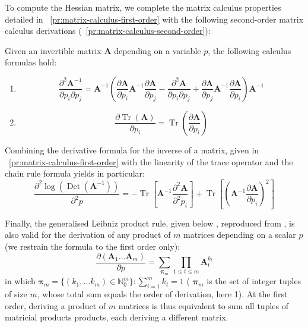 \documentclass[long, final]{jobim}
\DeclareMathOperator*{\Tr}{Tr}
\DeclareMathOperator*{\DET}{Det}
\begin{document}
To compute the Hessian matrix, we complete the matrix calculus properties detailed in \propertyname~\ref{pr:matrix-calculus-first-order} with the following second-order matrix calculus derivations (\propertyname~\ref{pr:matrix-calculus-second-order}):

\begin{property}
\label{pr:matrix-calculus-second-order}
Given an invertible matrix $\boldsymbol{A}$ depending on a variable $p$, the following calculus formulas hold:
\begin{multicols}{2}
\begin{enumerate}[label=(\alph*)]
\item 
$$ \frac{\partial^2 \boldsymbol{A}^{-1}}{\partial p_i \partial p_j} =  \boldsymbol{A}^{-1} \left( \frac{\partial \boldsymbol{A}}{\partial p_i } \boldsymbol{A}^{-1} \frac{\partial \boldsymbol{A}}{\partial p_j} - \frac{\partial^2 \boldsymbol{A}}{\partial p_i \partial p_j}  + \frac{\partial \boldsymbol{A}}{\partial p_j } \boldsymbol{A}^{-1} \frac{\partial \boldsymbol{A}}{\partial p_i}\right) \boldsymbol{A}^{-1}
$$
\item 
$$
\frac{\partial \Tr \left(\boldsymbol{A}\right)}{\partial p_i} = \Tr  \left(\frac{\partial \boldsymbol{A}}{\partial p_i}\right)
$$


\end{enumerate}
\end{multicols}

Combining the derivative formula for the inverse of a matrix, given in \propertyname~\ref{pr:matrix-calculus-first-order} with the linearity of the trace operator and the chain rule formula yields in particular:
\begin{equation*}
    \frac{\partial^2 \log \left(\DET (\boldsymbol{A}^{-1})\right)}{\partial^2 p} = - \Tr  \left[\boldsymbol{A}^{-1}\frac{\partial^2 \boldsymbol{A}}{\partial^2 p_i}\right] +
\Tr  \left[\left(\boldsymbol{A}^{-1}\frac{\partial \boldsymbol{A}}{\partial p_i}\right)^2\right]
\end{equation*}


Finally, the generalised Leibniz product rule, given below , reproduced from \cite{mulla20}, is also valid for the derivation of any product of $m$ matrices depending on a scalar $p$ (we restrain the formula to the first order only): 
\begin{equation*}
    \frac{\partial (\boldsymbol{A}_1 \ldots \boldsymbol{A}_m)}{\partial p} = \sum_{\boldsymbol{\pi}_m} \prod_{1\leq t \leq m}  \boldsymbol{A}_t^{k_t}
\end{equation*}
in which $\boldsymbol{\pi}_m = \{(k_1, \ldots k_m) \in \mathbb{N}_0^m \}: \sum_{i=1}^m k_t = 1$ ( $\boldsymbol{\pi}_m$ is the set of integer tuples of size $m$, whose total sum equals the order of derivation, here 1). At the first order, deriving a product of $m$ matrices is thus equivalent to sum all tuples of matricial products products, each deriving a different matrix. 
\end{property}
\end{document}
